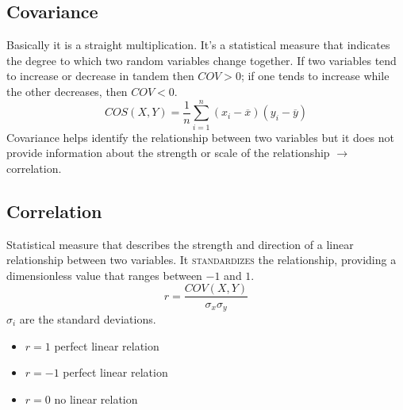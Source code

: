 \subsection{Covariance}
Basically it is a straight multiplication. It's a statistical measure that indicates the degree to which two random variables change together. If two variables tend to increase or decrease in tandem then $COV>0$; if one tends to increase while the other decreases, then $COV<0$. 
\begin{equation}
    COS(X,Y)=\frac{1}{n}\sum_{i=1}^n(x_i-\overline{x})(y_i-\overline{y})
\end{equation}
Covariance helps identify the relationship between two variables but it does not provide information about the strength or scale of the relationship $\rightarrow$ correlation.
\subsection{Correlation}
Statistical measure that describes the strength and direction of a linear relationship between two variables. It \textsc{standardizes} the relationship, providing a dimensionless value that ranges between $-1$ and $1$. 
\begin{equation}
    r=\frac{COV(X,Y)}{\sigma_x\sigma_y}
\end{equation}
$\sigma_i$ are the standard deviations. 
\begin{itemize}
    \item $r=1$ perfect  linear relation
    \item $r=-1$  perfect  linear relation
    \item $r=0$ no linear relation
\end{itemize}